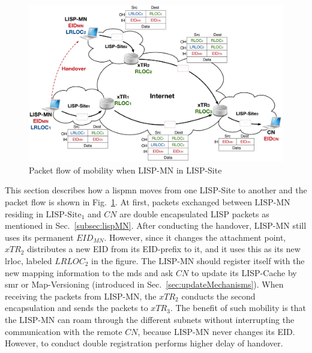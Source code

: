 \begin{figure}[!t]
	\centering
	\includegraphics[width=\textwidth]{Pics/LISP-MN_in_LISP-Site.eps}
	\caption{Packet flow of mobility when LISP-MN in LISP-Site}
	\label{LISP-MN_in_LISP-Site}
\end{figure}

This section describes how a \acrshort{lispmn} moves from one LISP-Site to another and the packet flow is shown in Fig.~\ref{LISP-MN_in_LISP-Site}. At first, packets exchanged between $\text{LISP-MN}$ residing in $\text{LISP-Site}_1$ and $CN$ are double encapsulated LISP packets as mentioned in Sec.~\ref{subsec:lispMN}. After conducting the handover, $\text{LISP-MN}$ still uses its permanent $EID_{MN}$. However, since it changes the attachment point, $xTR_2$ distributes a new EID from its EID-prefix to it, and it uses this as its new \acrshort{lrloc}, labeled $LRLOC_2$ in the figure. The $\text{LISP-MN}$ should register itself with the new mapping information to the \acrshort{mds} and ask $CN$ to update its LISP-Cache by \acrshort{smr} or Map-Versioning (introduced in Sec.~\ref{sec:updateMechanisms}). When receiving the packets from $\text{LISP-MN}$, the $xTR_2$ conducts the second encapsulation and sends the packets to $xTR_3$. The benefit of such mobility is that the $\text{LISP-MN}$ can roam through the different subnets without interrupting the communication with the remote $CN$, because $\text{LISP-MN}$ never changes its EID. However, to conduct double registration performs higher delay of handover.

